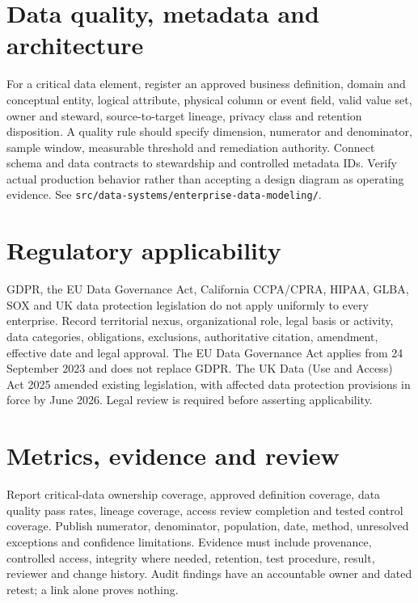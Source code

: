 \documentclass[11pt,letterpaper]{article}
\begin{document}
\section{Data quality, metadata and architecture}
For a critical data element, register an approved business definition, domain and conceptual entity, logical attribute, physical column or event field, valid value set, owner and steward, source-to-target lineage, privacy class and retention disposition. A quality rule should specify dimension, numerator and denominator, sample window, measurable threshold and remediation authority. Connect schema and data contracts to stewardship and controlled metadata IDs. Verify actual production behavior rather than accepting a design diagram as operating evidence. See \texttt{src/data-systems/enterprise-data-modeling/}.

\section{Regulatory applicability}
GDPR, the EU Data Governance Act, California CCPA/CPRA, HIPAA, GLBA, SOX and UK data protection legislation do not apply uniformly to every enterprise. Record territorial nexus, organizational role, legal basis or activity, data categories, obligations, exclusions, authoritative citation, amendment, effective date and legal approval. The EU Data Governance Act applies from 24 September 2023 and does not replace GDPR. The UK Data (Use and Access) Act 2025 amended existing legislation, with affected data protection provisions in force by June 2026. Legal review is required before asserting applicability.

\section{Metrics, evidence and review}
Report critical-data ownership coverage, approved definition coverage, data quality pass rates, lineage coverage, access review completion and tested control coverage. Publish numerator, denominator, population, date, method, unresolved exceptions and confidence limitations. Evidence must include provenance, controlled access, integrity where needed, retention, test procedure, result, reviewer and change history. Audit findings have an accountable owner and dated retest; a link alone proves nothing.
\end{document}
